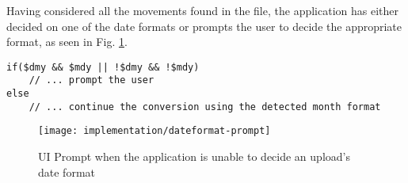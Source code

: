 Having considered all the movements found in the file, the application has either decided on one of the date formats or prompts the user to decide the appropriate format, as seen in Fig. \ref{fig:dateformat-prompt}.

\lstset{style=phpcolor}
\begin{lstlisting}[float,floatplacement=H]
if($dmy && $mdy || !$dmy && !$mdy)
    // ... prompt the user
else
    // ... continue the conversion using the detected month format
\end{lstlisting}

\begin{figure}[h]
    \centering
    \texttt{[image: implementation/dateformat-prompt]}
    \caption{UI Prompt when the application is unable to decide an upload's date format}
    \label{fig:dateformat-prompt}
\end{figure}

